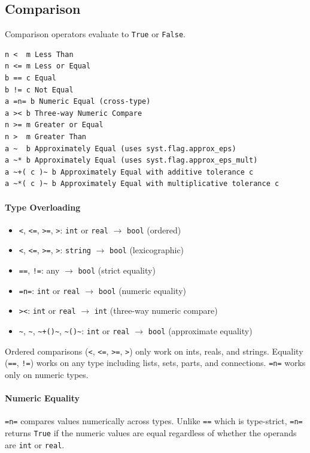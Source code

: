 \documentclass{report}
\begin{document}
\subsection{Comparison}
Comparison operators evaluate to \texttt{True} or \texttt{False}.
\begin{verbatim}
n <  m Less Than
n <= m Less or Equal
b == c Equal
b != c Not Equal
a =n= b Numeric Equal (cross-type)
a >< b Three-way Numeric Compare
n >= m Greater or Equal
n >  m Greater Than
a ~  b Approximately Equal (uses syst.flag.approx_eps)
a ~* b Approximately Equal (uses syst.flag.approx_eps_mult)
a ~+( c )~ b Approximately Equal with additive tolerance c
a ~*( c )~ b Approximately Equal with multiplicative tolerance c
\end{verbatim}

\paragraph{Type Overloading}
\begin{itemize}
\item \texttt{<}, \texttt{<=}, \texttt{>=}, \texttt{>}: \texttt{int} or \texttt{real} $\rightarrow$ \texttt{bool} (ordered)
\item \texttt{<}, \texttt{<=}, \texttt{>=}, \texttt{>}: \texttt{string} $\rightarrow$ \texttt{bool} (lexicographic)
\item \texttt{==}, \texttt{!=}: any $\rightarrow$ \texttt{bool} (strict equality)
\item \texttt{=n=}: \texttt{int} or \texttt{real} $\rightarrow$ \texttt{bool} (numeric equality)
\item \texttt{><}: \texttt{int} or \texttt{real} $\rightarrow$ \texttt{int} (three-way numeric compare)
\item \texttt{\textasciitilde}, \texttt{\textasciitilde*}, \texttt{\textasciitilde+()\textasciitilde}, \texttt{\textasciitilde*()\textasciitilde}: \texttt{int} or \texttt{real} $\rightarrow$ \texttt{bool} (approximate equality)
\end{itemize}

Ordered comparisons (\texttt{<}, \texttt{<=}, \texttt{>=}, \texttt{>}) only work on ints, reals, and strings. Equality (\texttt{==}, \texttt{!=}) works on any type including lists, sets, parts, and connections. \texttt{=n=} works only on numeric types.

\paragraph{Numeric Equality}
\texttt{=n=} compares values numerically across types. Unlike \texttt{==} which is type-strict, \texttt{=n=} returns \texttt{True} if the numeric values are equal regardless of whether the operands are \texttt{int} or \texttt{real}.
\end{document}
